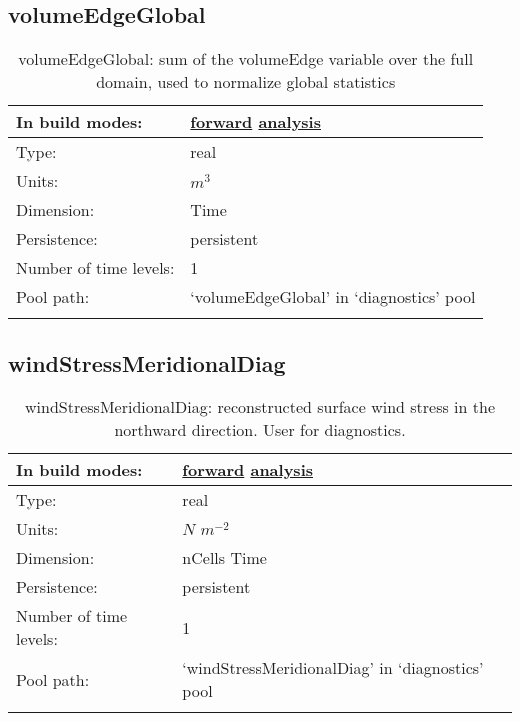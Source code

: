 \subsection[volumeEdgeGlobal]{volumeEdgeGlobal}
\label{subsec:var_sec_diagnostics_volumeEdgeGlobal}
\begin{center}
\begin{longtable}{| p{2.0in} | p{4.0in} |}
        \hline 
        In build modes: & \hyperref[subsec:forward_var_tab_diagnostics]{forward} \hyperref[subsec:analysis_var_tab_diagnostics]{analysis} \\
        \hline 
        Type: & real \\
        \hline 
        Units: & $m^3$ \\
        \hline 
        Dimension: & Time \\
        \hline 
        Persistence: & persistent \\
        \hline 
        Number of time levels: & 1 \\
        \hline 
            Pool path: & `volumeEdgeGlobal' in `diagnostics' pool \\
		 \hline 
    \caption{volumeEdgeGlobal: sum of the volumeEdge variable over the full domain, used to normalize global statistics}
\end{longtable}
\end{center}
\subsection[windStressMeridionalDiag]{windStressMeridionalDiag}
\label{subsec:var_sec_diagnostics_windStressMeridionalDiag}
\begin{center}
\begin{longtable}{| p{2.0in} | p{4.0in} |}
        \hline 
        In build modes: & \hyperref[subsec:forward_var_tab_diagnostics]{forward} \hyperref[subsec:analysis_var_tab_diagnostics]{analysis} \\
        \hline 
        Type: & real \\
        \hline 
        Units: & $N$ $m^{-2}$ \\
        \hline 
        Dimension: & nCells Time \\
        \hline 
        Persistence: & persistent \\
        \hline 
        Number of time levels: & 1 \\
        \hline 
            Pool path: & `windStressMeridionalDiag' in `diagnostics' pool \\
		 \hline 
    \caption{windStressMeridionalDiag: reconstructed surface wind stress in the northward direction. User for diagnostics.}
\end{longtable}
\end{center}
